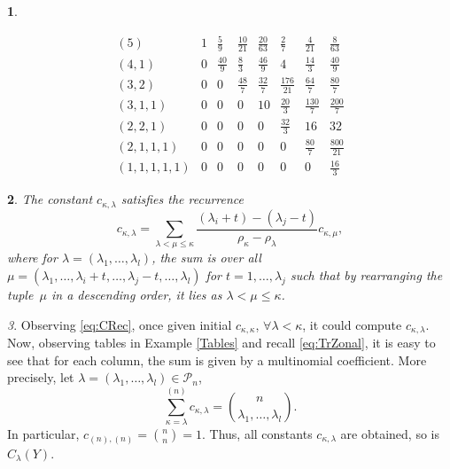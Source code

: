 \documentclass[10pt,oneside,american]{amsart}
\numberwithin{equation}{section}
\numberwithin{figure}{section}
\theoremstyle{plain}
\newtheorem{thm}{\protect\theoremname}[section]
\theoremstyle{definition}
\theoremstyle{remark}
\newtheorem{rem}[thm]{\protect\remarkname}
\theoremstyle{plain}
\theoremstyle{definition}
\newtheorem{example}[thm]{\protect\examplename}
\theoremstyle{plain}
\theoremstyle{plain}
\providecommand{\examplename}{Example}
\providecommand{\remarkname}{Remark}
\providecommand{\theoremname}{Theorem}
\begin{document}
\begin{example}
\begin{itemize}
\[\begin{array}{c|ccccccc}
\left(5\right) & 1 & \frac{5}{9} & \frac{10}{21} & \frac{20}{63} & \frac{2}{7} & \frac{4}{21} & \frac{8}{63}\\
\left(4,1\right) & 0 & \frac{40}{9} & \frac{8}{3} & \frac{46}{9} & 4 & \frac{14}{3} & \frac{40}{9}\\
\left(3,2\right) & 0 & 0 & \frac{48}{7} & \frac{32}{7} & \frac{176}{21} & \frac{64}{7} & \frac{80}{7}\\
\left(3,1,1\right) & 0 & 0 & 0 & 10 & \frac{20}{3} & \frac{130}{7} & \frac{200}{7}\\
\left(2,2,1\right) & 0 & 0 & 0 & 0 & \frac{32}{3} & 16 & 32\\
\left(2,1,1,1\right) & 0 & 0 & 0 & 0 & 0 & \frac{80}{7} & \frac{800}{21}\\
\left(1,1,1,1,1\right) & 0 & 0 & 0 & 0 & 0 & 0 & \frac{16}{3}
\end{array}
\]
\end{itemize}
\end{example}
\begin{thm}
The constant $c_{\kappa,\lambda}$ satisfies the recurrence \cite[eq.~14, p.~234]{Muirhead}
\begin{equation}
c_{\kappa,\lambda}=\sum_{\lambda<\mu\leq\kappa}\frac{\left(\lambda_{i}+t\right)-\left(\lambda_{j}-t\right)}{\rho_{\kappa}-\rho_{\lambda}}c_{\kappa,\mu},\label{eq:CRec}
\end{equation}
where for $\lambda=\left(\lambda_{1},\ldots,\lambda_{l}\right)$,
the sum is over all $\mu=\left(\lambda_{1},\ldots,\lambda_{i}+t,\ldots,\lambda_{j}-t,\ldots,\lambda_{l}\right)$
for $t=1,\ldots,\lambda_{j}$ such that by rearranging the tuple~$\mu$
in a descending order, it lies as $\lambda<\mu\leq\kappa$.
\end{thm}
\begin{rem}
Observing \eqref{eq:CRec}, once given initial $c_{\kappa,\kappa}$,
$\forall\lambda<\kappa$, it could compute $c_{\kappa,\lambda}$.
Now, observing tables in Example \ref{Tables} and recall \eqref{eq:TrZonal},
it is easy to see that for each column, the sum is given by a multinomial
coefficient. More precisely, let $\lambda=\left(\lambda_{1},\ldots,\lambda_{l}\right)\in\mathcal{P}_{n}$,
\begin{equation}
  \sum_{\kappa=\lambda}^{\left(n\right)}c_{\kappa,\lambda}=\binom{n}{\lambda_{1},\ldots,\lambda_{l}}.\label{eq:CInitial}
\end{equation}
In particular, $c_{\left(n\right),\left(n\right)}=\binom{n}{n}=1$.
Thus, all constants $c_{\kappa,\lambda}$ are obtained, so is $C_{\lambda}(Y)$. 
\end{rem}
\end{document}
